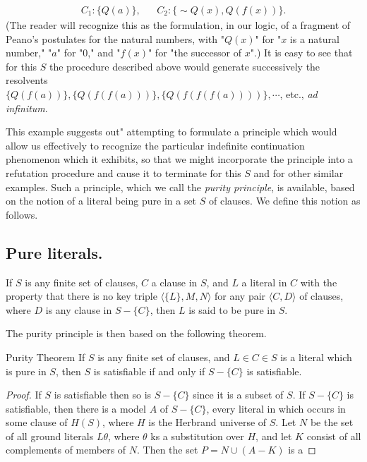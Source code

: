 \documentclass[8pt]{extarticle}
\begin{document}
\begin{align*}
    C_1 : \{Q(a)\}, && C_2 : \{\sim Q(x), Q(f(x))\}.
\end{align*}
\noindent
(The reader will recognize this as the formulation, in our logic, of a fragment of Peano's postulates for the natural numbers, with "$Q(x)$" for "$x$ is a natural number," "$a$" for "$0$," and "$f(x)$" for "the successor of $x$".) It is easy to see that for this $S$ the procedure described above would generate successively the resolvents\\$\{Q(f(a))\},\{Q(f(f(a)))\},\{Q(f(f(f(a))))\},\dotsm$, etc., \emph{ad infinitum}.

This example suggests out" attempting to formulate a principle which would 
allow us effectively to recognize the particular indefinite continuation phenomenon which it exhibits, so that we might incorporate the principle into a refutation procedure and cause it to terminate for this $S$ and for other similar examples. Such a principle, which we call the \emph{purity principle}, is available, based on the notion of a literal being pure in a set $S$ of clauses. We define this notion as follows.

\subsection{Pure literals.}
If $S$ is any finite set of clauses, $C$ a clause in $S$, and $L$ a literal in $C$ with the property that there is no key triple $\langle\{L\}, M, N\rangle$ for any pair $\langle C,D\rangle$ of clauses, where $D$ is any clause in $S - \{C\}$, then $L$ is said to be pure in $S$.

The purity principle is then based on the following theorem. 

\begin{p15theorem}{Purity Theorem}
If $S$ is any finite set of clauses, and $L\in C\in S$ is a literal which is pure in $S$, then $S$ is satisfiable if and only if $S - \{C\}$ is satisfiable.
\end{p15theorem}
\begin{proof}
If $S$ is satisfiable then so is $S - \{C\}$ since it is a subset of $S$. If $S - \{C\}$
is satisfiable, then there is a model $A$ of $S - \{C\}$, every literal in which occurs 
in some clause of $H(S)$, where $H$ is the Herbrand universe of $S$. Let $N$ be the 
set of all ground literals $L\theta$, where $\theta$ ks a substitution over $H$, and let $K$ consist of all complements of members of $N$. Then the set $P = N \cup (A - K)$ is a
\end{proof}
\end{document}
